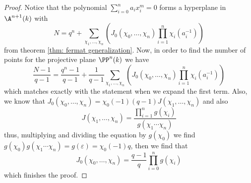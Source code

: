 \begin{proof}
   Notice that the polynomial \(\sum_{i=0}^{n} a_ix_i^{m} = 0\) forms a
   hyperplane in \(\A^{n+1}(k)\) with 
   \[
      N = q^n + \sum_{\chi_1,\dots, \chi_n} \left( J_0(\chi_0,\dots,\chi_n)
      \prod_{i=1}^n \chi_i(a_i^{-1}) \right) 
   \] 
   from theorem \ref{thm: fermat generalization}. Now, in order to find the
   number of points for the projective plane \(\PP^n(k)\) we have
   \[
      \frac{N-1}{q-1} = \frac{q^n - 1}{q-1} + \frac{1}{q-1}\sum_{\chi_1,\dots,
      \chi_n} \left( J_0(\chi_0,\dots,\chi_n) \prod_{i=1}^n \chi_i(a_i^{-1})
      \right) 
   \] 
   which matches exactly with the statement when we expand the first term.
   Also, we know that \(J_0(\chi_0,\dots,\chi_n) =
   \chi_0(-1)(q-1)J(\chi_1,\dots,\chi_n)\) and also 
    \[
       J(\chi_1,\dots,\chi_n) = \frac{\prod_{i=1}^{n}
       g(\chi_i)}{g(\chi_1\cdots\chi_n)}
   \] 
   thus, multiplying and dividing the equation by \(g(\chi_0)\) we find
   \(g(\chi_0)g(\chi_1\cdots\chi_n) = g(\varepsilon) = \chi_0(-1)q\), then we
   find that
   \[
      J_0(\chi_0,\dots,\chi_n) = \frac{q-1}{q} \prod_{i=0}^{n} g(\chi_i)
   \] 
   which finishes the proof.
\end{proof}
